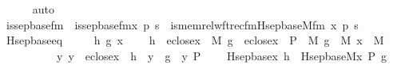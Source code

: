 \begin{isabellebody}
\ \ \ \ \isamarkupfalse%
\ auto\isanewline
{}\isamarkupfalse%
%
\endisatagproof
{\isafoldproof}%
%
\isadelimproof
\isanewline
%
\endisadelimproof
\isanewline
{}\isamarkupfalse%
\ is{\isacharunderscore}{\kern0pt}sep{\isacharunderscore}{\kern0pt}base{\isacharunderscore}{\kern0pt}fm\ \ {\isachardoublequoteopen}is{\isacharunderscore}{\kern0pt}sep{\isacharunderscore}{\kern0pt}base{\isacharunderscore}{\kern0pt}fm{\isacharparenleft}{\kern0pt}x{\isacharcomma}{\kern0pt}\ p{\isacharcomma}{\kern0pt}\ s{\isacharparenright}{\kern0pt}\ {\isasymequiv}\ is{\isacharunderscore}{\kern0pt}memrel{\isacharunderscore}{\kern0pt}wftrec{\isacharunderscore}{\kern0pt}fm{\isacharparenleft}{\kern0pt}Hsep{\isacharunderscore}{\kern0pt}base{\isacharunderscore}{\kern0pt}M{\isacharunderscore}{\kern0pt}fm{\isacharcomma}{\kern0pt}\ x{\isacharcomma}{\kern0pt}\ p{\isacharcomma}{\kern0pt}\ s{\isacharparenright}{\kern0pt}{\isachardoublequoteclose}\ \isanewline
\isanewline
{}\isamarkupfalse%
\ Hsep{\isacharunderscore}{\kern0pt}base{\isacharunderscore}{\kern0pt}eq\ {\isacharcolon}{\kern0pt}\ \isanewline
\ \ \ h\ g\ x\ \isanewline
\ \ \ {\isachardoublequoteopen}h\ {\isasymin}\ eclose{\isacharparenleft}{\kern0pt}x{\isacharparenright}{\kern0pt}\ {\isasymrightarrow}\ M{\isachardoublequoteclose}\ {\isachardoublequoteopen}g\ {\isasymin}\ eclose{\isacharparenleft}{\kern0pt}x{\isacharparenright}{\kern0pt}\ {\isasymtimes}\ {\isacharbraceleft}{\kern0pt}P{\isacharbraceright}{\kern0pt}\ {\isasymrightarrow}\ M{\isachardoublequoteclose}\ {\isachardoublequoteopen}g\ {\isasymin}\ M{\isachardoublequoteclose}\ {\isachardoublequoteopen}x\ {\isasymin}\ M{\isachardoublequoteclose}\ \isanewline
\ \ \ \ \ \ \ \ \ \ {\isachardoublequoteopen}{\isasymAnd}y{\isachardot}{\kern0pt}\ y\ {\isasymin}\ eclose{\isacharparenleft}{\kern0pt}x{\isacharparenright}{\kern0pt}\ {\isasymLongrightarrow}\ h\ {\isacharbackquote}{\kern0pt}\ y\ {\isacharequal}{\kern0pt}\ g\ {\isacharbackquote}{\kern0pt}\ {\isasymlangle}y{\isacharcomma}{\kern0pt}\ P{\isasymrangle}{\isachardoublequoteclose}\ \isanewline
\ \ \ {\isachardoublequoteopen}Hsep{\isacharunderscore}{\kern0pt}base{\isacharparenleft}{\kern0pt}x{\isacharcomma}{\kern0pt}\ h{\isacharparenright}{\kern0pt}\ {\isacharequal}{\kern0pt}\ Hsep{\isacharunderscore}{\kern0pt}base{\isacharunderscore}{\kern0pt}M{\isacharparenleft}{\kern0pt}{\isasymlangle}x{\isacharcomma}{\kern0pt}\ P{\isasymrangle}{\isacharcomma}{\kern0pt}\ g{\isacharparenright}{\kern0pt}{\isachardoublequoteclose}\isanewline

\end{isabellebody}

